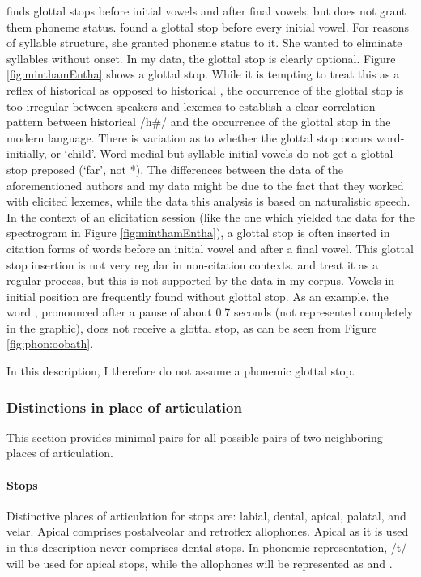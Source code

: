 \citet{Tapovanaye1995} finds glottal stops  before initial vowels and after final vowels, but does not grant them phoneme status.
\citet{Bichsel} found a glottal stop before every initial vowel. For reasons of syllable structure, she granted phoneme status to it. She wanted to eliminate syllables without onset.  In my data, the glottal stop is clearly optional.  Figure \ref{fig:minthamEntha} shows a glottal stop. While it is tempting to treat this as a reflex of historical  as opposed to historical , the occurrence of the glottal stop is too irregular between speakers and lexemes to establish a clear correlation pattern between historical /h\#/ and the occurrence of the glottal stop in the modern language.
There is variation as to whether the glottal stop occurs word-initially,  or  `child'. Word-medial but syllable-initial vowels do not get a glottal stop preposed (`far', not *). The differences between the data of the aforementioned authors and my data might be due to the fact that they worked with elicited lexemes, while the data this analysis is based on  naturalistic speech. In the context of an elicitation session (like the one which yielded the data for the spectrogram in Figure \ref{fig:minthamEntha}), a glottal stop is often inserted in citation forms of words before an initial vowel and after a final vowel. This glottal stop insertion is not very regular in non-citation contexts. \citet{Bichsel} and \citet{Tapovanaye1995} treat it as a regular process, but this is not supported by the data in my corpus.  Vowels in initial position are frequently found without glottal stop. As an example, the word , pronounced after a pause of about 0.7 seconds (not  represented completely in the graphic), does not receive a glottal stop, as can be seen from Figure \ref{fig:phon:oobath}.

In this description, I therefore do not assume a phonemic glottal stop. 

\subsubsection{Distinctions in place of articulation}\label{sec:phon:Distinctionsinplaceofarticulation}
This section provides minimal pairs for all possible pairs of two neighboring places of articulation.

\paragraph{Stops}
Distinctive places of articulation for stops are:  labial, dental, apical, palatal, and velar. Apical comprises postalveolar and retroflex allophones. Apical as it is used in this description never comprises dental stops. In phonemic representation, /t/ will be used for apical stops, while the allophones will be represented as \phonet{\postalvt,\postalvd} and \phonet{\tz,\dz}.\\

